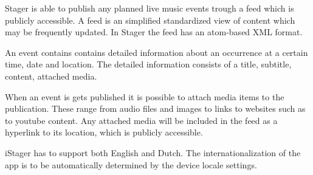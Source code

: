 Stager is able to publish any planned live music events trough a feed which is publicly accessible. A feed is an simplified standardized view of content which may be frequently updated. In Stager the feed has an atom-based XML format.

An event contains contains detailed information about an occurrence at a certain time, date and location. The detailed information consists of a title, subtitle, content, attached media. 

When an event is gets published it is possible to attach media items to the publication. These range from audio files and images to  links to websites such as to youtube content. Any attached media will be included in the feed as a hyperlink to its location, which is publicly accessible.

iStager has to support both English and Dutch. The internationalization of the app is to be automatically determined by the device locale settings. 



